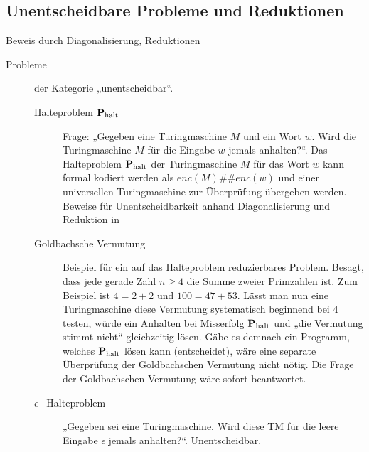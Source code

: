 \subsection{Unentscheidbare Probleme und Reduktionen}
    Beweis durch Diagonalisierung, Reduktionen 
    \begin{description}
        \item[Probleme] der Kategorie „unentscheidbar“.
        \begin{description}
            \item[Halteproblem $\textbf{P}_{\text{halt}}$] Frage: „Gegeben eine Turingmaschine $M$ und ein Wort $w$. Wird die Turingmaschine $M$ für die Eingabe $w$ jemals anhalten?“. Das Halteproblem $\textbf{P}_{\text{halt}}$ der Turingmaschine $M$ für das Wort $w$ kann formal kodiert werden als $enc(M)\#\#enc(w)$ und einer universellen Turingmaschine zur Überprüfung übergeben werden. Beweise für Unentscheidbarkeit anhand Diagonalisierung und Reduktion in 

            \item[Goldbachsche Vermutung] Beispiel für ein auf das Halteproblem reduzierbares Problem. Besagt, dass jede gerade Zahl $n \ge 4$ die Summe zweier Primzahlen ist. Zum Beispiel ist $4 = 2 + 2$ und $100 = 47 + 53$. Lässt man nun eine Turingmaschine diese Vermutung systematisch beginnend bei $4$ testen, würde ein Anhalten bei Misserfolg $\textbf{P}_{\text{halt}}$ und „die Vermutung stimmt nicht“ gleichzeitig lösen. Gäbe es demnach ein Programm, welches $\textbf{P}_{\text{halt}}$ lösen kann (entscheidet), wäre eine separate Überprüfung der Goldbachschen Vermutung nicht nötig. Die Frage der Goldbachschen Vermutung wäre sofort beantwortet.

            \item[$\epsilon$~-Halteproblem] „Gegeben sei eine Turingmaschine. Wird diese TM für die leere Eingabe $\epsilon$ jemals anhalten?“. Unentscheidbar.
        \end{description}


\end{description}
